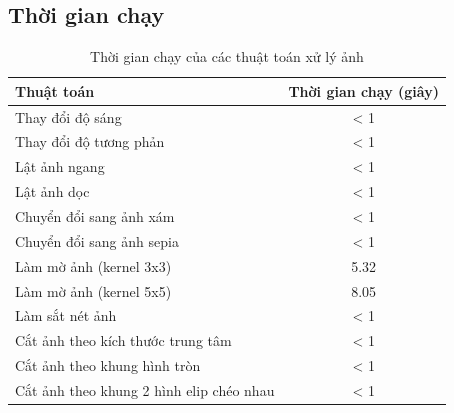 \subsection{Thời gian chạy}
\begin{table}[H]
	\centering
	\caption{Thời gian chạy của các thuật toán xử lý ảnh}
	\label{tab:execution_time}
	\begin{tabular}{|l|c|}
		\hline
		\textbf{Thuật toán}                      & \textbf{Thời gian chạy (giây)} \\ \hline
		Thay đổi độ sáng                         & < 1                            \\ \hline
		Thay đổi độ tương phản                   & < 1                            \\ \hline
		Lật ảnh ngang                            & < 1                            \\ \hline
		Lật ảnh dọc                              & < 1                            \\ \hline
		Chuyển đổi sang ảnh xám                  & < 1                            \\ \hline
		Chuyển đổi sang ảnh sepia                & < 1                            \\ \hline
		Làm mờ ảnh (kernel 3x3)                  & 5.32                           \\ \hline
		Làm mờ ảnh (kernel 5x5)                  & 8.05                           \\ \hline
		Làm sắt nét ảnh                          & < 1                            \\ \hline
		Cắt ảnh theo kích thước trung tâm        & < 1                            \\ \hline
		Cắt ảnh theo khung hình tròn             & < 1                            \\ \hline
		Cắt ảnh theo khung 2 hình elip chéo nhau & < 1                            \\ \hline
	\end{tabular}
\end{table}